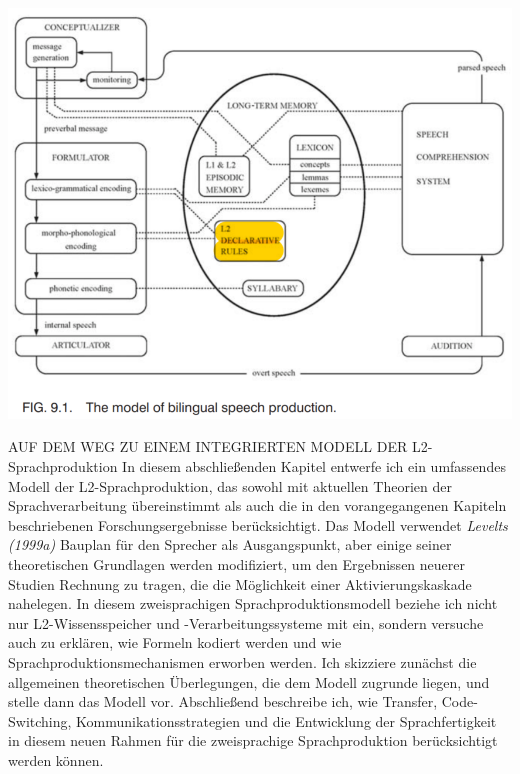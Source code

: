 \documentclass[
  letterpaper,
]{scrbook}
\begin{document}
\includegraphics[width=1\textwidth,height=\textheight]{./pictures/kormos_L2_speech_production_model.png}

AUF DEM WEG ZU EINEM INTEGRIERTEN MODELL DER L2-Sprachproduktion In
diesem abschließenden Kapitel entwerfe ich ein umfassendes Modell der
L2-Sprachproduktion, das sowohl mit aktuellen Theorien der
Sprachverarbeitung übereinstimmt als auch die in den vorangegangenen
Kapiteln beschriebenen Forschungsergebnisse berücksichtigt. Das Modell
verwendet \emph{Levelts (1999a)} Bauplan für den Sprecher als
Ausgangspunkt, aber einige seiner theoretischen Grundlagen werden
modifiziert, um den Ergebnissen neuerer Studien Rechnung zu tragen, die
die Möglichkeit einer Aktivierungskaskade nahelegen. In diesem
zweisprachigen Sprachproduktionsmodell beziehe ich nicht nur
L2-Wissensspeicher und -Verarbeitungssysteme mit ein, sondern versuche
auch zu erklären, wie Formeln kodiert werden und wie
Sprachproduktionsmechanismen erworben werden. Ich skizziere zunächst die
allgemeinen theoretischen Überlegungen, die dem Modell zugrunde liegen,
und stelle dann das Modell vor. Abschließend beschreibe ich, wie
Transfer, Code-Switching, Kommunikationsstrategien und die Entwicklung
der Sprachfertigkeit in diesem neuen Rahmen für die zweisprachige
Sprachproduktion berücksichtigt werden können.
\end{document}

